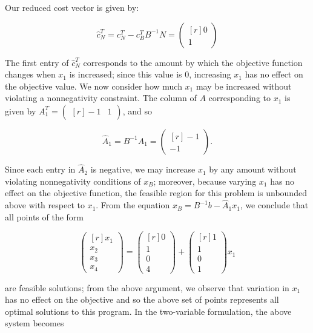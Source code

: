 \begin{solution}
  Our reduced cost vector is given by:

  $$
  \hat{c}_N^T = c_N^T  - c_B^T B^{-1} N = \begin{pmatrix*}[r]
    0 \\
    1
  \end{pmatrix*}
  $$

  The first entry of $\hat{c}_N^T$ corresponds to the amount by which the objective function changes when $x_1$ is
  increased; since this value is 0, increasing $x_1$ has no effect on the objective value. We now consider how much 
  $x_1$ may be increased without violating a nonnegativity constraint. The column of $A$ corresponding to $x_1$ is given
  by $A_1^T = \begin{pmatrix*}[r]
    -1 & 1
  \end{pmatrix*}$, and so

  $$ 
    \hat{A}_1 = B^{-1}A_1 = \begin{pmatrix*}[r]
      -1 \\
      -1
    \end{pmatrix*}.
  $$ 

  Since each entry in $\hat{A}_2$ is negative, we may increase $x_1$ by any amount without violating nonnegativity 
  conditions of $x_B$; moreover, because varying $x_1$ has no effect on the objective function, the feasible region for 
  this problem is unbounded above with respect to $x_1$. From the equation $x_B = B^{-1}b - \hat{A}_1 x_1$, we conclude
  that all points of the form

  $$
    \begin{pmatrix*}[r]
      x_1 \\
      x_2 \\
      x_3 \\
      x_4
    \end{pmatrix*} = \begin{pmatrix*}[r]
      0 \\
      1 \\
      0 \\
      4
    \end{pmatrix*} + \begin{pmatrix*}[r]
      1 \\
      1 \\
      0 \\
      1
    \end{pmatrix*} x_1
  $$

  are feasible solutions; from the above argument, we observe that variation in $x_1$ has no effect on the objective and
  so the above set of points represents all optimal solutions to this program. In the two-variable formulation, the
  above system becomes


\end{solution}
